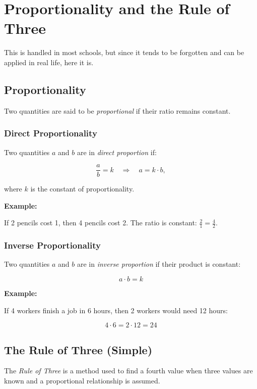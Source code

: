 \chapter{Proportionality and the Rule of Three}

This is handled in most schools, but since it tends to be forgotten and can be applied in real life, here it is.

\section{Proportionality}

Two quantities are said to be \emph{proportional} if their ratio remains constant.

\subsection{Direct Proportionality}

Two quantities \(a\) and \(b\) are in \emph{direct proportion} if:

\[
    \frac{a}{b} = k \quad \Rightarrow \quad a = k \cdot b,
\]

where \(k\) is the constant of proportionality.

\textbf{Example:}

If 2 pencils cost 1, then 4 pencils cost 2. The ratio is constant: \(\frac{2}{1} = \frac{4}{2}\).

\subsection{Inverse Proportionality}

Two quantities \(a\) and \(b\) are in \emph{inverse proportion} if their product is constant:

\[
    a \cdot b = k
\]

\textbf{Example:}

If 4 workers finish a job in 6 hours, then 2 workers would need 12 hours:

\[
    4 \cdot 6 = 2 \cdot 12 = 24
\]

\section{The Rule of Three (Simple)}

The \emph{Rule of Three} is a method used to find a fourth value when three values are known and a 
proportional relationship is assumed.


